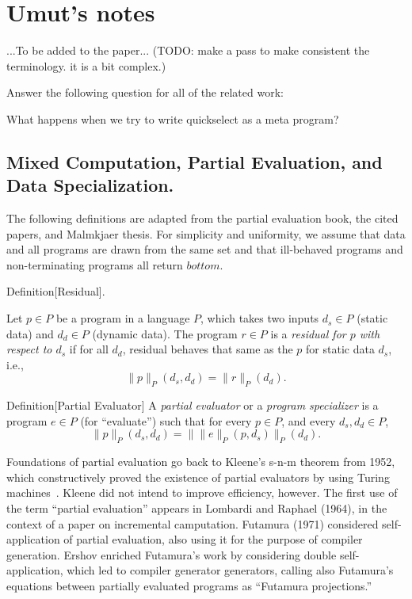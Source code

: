 
\section{Umut's notes}

...To be added to the paper...
(TODO: make a pass to make consistent the terminology. it is a bit complex.)

Answer the following question for all of the related work:

What happens when we try to write quickselect as a meta program? 

\newcommand{\drun}[2]{\lVert{#2}\rVert_{#1}}

\subsection{Mixed Computation, Partial Evaluation, and Data Specialization.}


The following definitions are adapted from the partial evaluation
book, the cited papers, and Malmkjaer thesis.  For simplicity and
uniformity, we assume that data and all programs are drawn from the
same set and that ill-behaved programs and non-terminating programs
all return $bottom$.

Definition[Residual].  

Let $p \in P$ be a program in a language $P$, which takes two inputs
$d_s \in P$ (static data) and $d_d \in P$ (dynamic data).  The program
$r \in P$ is a {\em residual for $p$ with respect to $d_s$} if for all
$d_d$, residual behaves that same as the $p$ for static data $d_s$,
i.e., 
\[
\drun{P}{p} (d_s, d_d) = \drun{P}{r} (d_d).
\]


Definition[Partial Evaluator]
A {\em partial evaluator} or a {\em program specializer} is a program
$e \in P$ (for ``evaluate'') such that for every $p \in P$, and every
$d_s, d_d \in P$, 
\[
\drun{P}{p} (d_s, d_d) = \drun{P}{\drun{P}{e}(p, d_s)} (d_d).
\]

Foundations of partial evaluation go back to Kleene's s-n-m theorem
from 1952, which constructively proved the existence of partial
evaluators by using Turing machines~\cite{Kleene52}.  Kleene did not
intend to improve efficiency, however. The first use of the term
``partial evaluation'' appears in Lombardi and Raphael (1964), in the
context of a paper on incremental camputation. Futamura (1971)
considered self-application of partial evaluation, also using it for
the purpose of compiler generation.  Ershov enriched Futamura's work
by considering double self-application, which led to compiler
generator generators, calling also Futamura's equations between
partially evaluated programs as ``Futamura projections.''  


